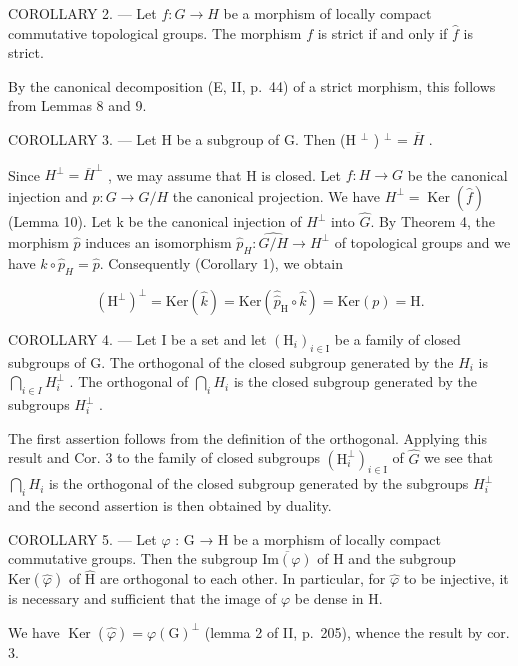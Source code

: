 COROLLARY 2. --- Let \(f\colon G\to H\) be a morphism of locally compact commutative topological groups. The morphism \(f\) is strict if and only if \(\widehat{f}\) is strict.

By the canonical decomposition (E, II, p.~44) of a strict morphism, this follows from Lemmas 8 and 9.

COROLLARY 3. --- Let H be a subgroup of G. Then (H \(^{\perp}\) ) \(^{\perp}\) = \(\overline{H}\) .

Since \(H^{\perp} = \overline{H}^{\perp}\) , we may assume that H is closed. Let \(f: H \to G\) be the canonical injection and \(p: G \to G/H\) the canonical projection. We have \(H^{\perp} = \operatorname{Ker}(\widehat{f})\) (Lemma 10). Let k be the canonical injection of \(H^{\perp}\) into \(\widehat{G}\). By Theorem 4, the morphism \(\widehat{p}\) induces an isomorphism \(\widehat{p}_{H}: \widehat{G/H} \to H^{\perp}\) of topological groups and we have \(k \circ \widehat{p}_{H} = \widehat{p}\). Consequently (Corollary 1), we obtain

\[
(\mathrm{H} ^ {\perp}) ^ {\perp} = \mathrm{Ker} (\widehat {k}) = \mathrm{Ker} (\widehat {\widehat {p}} _ {\mathrm{H}} \circ \widehat {k}) = \mathrm{Ker} (p) = \mathrm{H}.
\]

COROLLARY 4. --- Let I be a set and let \((\mathrm{H}_{i})_{i\in\mathrm{I}}\) be a family of closed subgroups of G. The orthogonal of the closed subgroup generated by the \(H_{i}\) is \(\bigcap_{i\in I}H_{i}^{\perp}\) . The orthogonal of \(\bigcap_{i}H_{i}\) is the closed subgroup generated by the subgroups \(H_{i}^{\perp}\) .

The first assertion follows from the definition of the orthogonal. Applying this result and Cor. 3 to the family of closed subgroups \((\mathrm{H}_{i}^{\perp})_{i\in\mathrm{I}}\) of \(\widehat{G}\) we see that \(\bigcap_{i}H_{i}\) is the orthogonal of the closed subgroup generated by the subgroups \(H_{i}^{\perp}\) and the second assertion is then obtained by duality.

COROLLARY 5. --- Let \(\varphi\) : G → H be a morphism of locally compact commutative groups. Then the subgroup \(\overline{\text{Im}(\varphi)}\) of H and the subgroup \(\text{Ker}(\widehat{\varphi})\) of \(\widehat{\text{H}}\) are orthogonal to each other. In particular, for \(\widehat{\varphi}\) to be injective, it is necessary and sufficient that the image of \(\varphi\) be dense in H.

We have \(\operatorname{Ker}(\widehat{\varphi}) = \varphi(\mathrm{G})^{\perp}\) (lemma 2 of II, p.~205), whence the result by cor. 3.

